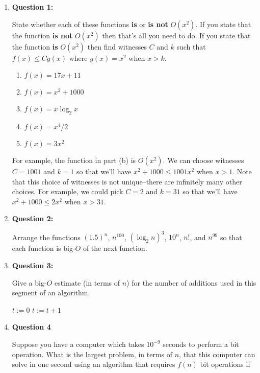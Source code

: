 \documentclass[11pt]{article}
\begin{document}
\begin{enumerate}

\item
\textbf{Question 1:}

State whether each of these functions \textbf{is} or \textbf{is not} $O(x^2)$. If you state that the function \textbf{is not} $O(x^2)$ then that's all you need to do. If you state that the function \textbf{is} $O(x^2)$ then find witnesses $C$ and $k$ such that $f(x) \leq Cg(x)$ where $g(x)=x^2$ when $x>k$.

\begin{enumerate}[label=(\alph*)]
\item $f(x)=17x+11$
\item $f(x)=x^2 + 1000$
\item $f(x) = x \log_2 x$
\item $f(x) = x^4 / 2$
\item $f(x) = 3x^2$
\end{enumerate}

For example, the function in part (b) is $O(x^2)$. We can choose witnesses $C=1001$ and $k=1$ so that we'll have $x^2+1000 \leq 1001 x^2$ when $x>1$. Note that this choice of witnesses is not unique--there are infinitely many other choices. For example, we could pick $C=2$ and $k=31$ so that we'll have $x^2+1000 \leq 2 x^2$ when $x>31$.

\item
\textbf{Question 2:}

Arrange the functions $(1.5)^n$, $n^{100}$, $(\log_2 n)^3$, $10^n$, $n!$, and $n^{99}$ so that each function is big-$O$ of the next function.

\item
\textbf{Question 3:}

Give a big-$O$ estimate (in terms of $n$) for the number of additions used in this segment of an algorithm.

\begin{algorithmic}
\STATE $t := 0$
        \STATE $t:= t + 1$
    \ENDFOR
\ENDFOR
\end{algorithmic}

\item
\textbf{Question 4}

Suppose you have a computer which takes $10^{-9}$ seconds to perform a bit operation. What is the largest problem, in terms of $n$, that this computer can solve in one second using an algorithm that requires $f(n)$ bit operations if


\end{enumerate}
\end{document}
